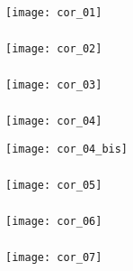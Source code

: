 \fi
\ifprof

\setcounter{exo}{0}

\subparagraph{}
\begin{center}
\texttt{[image: cor\_01]}
\end{center}

\subparagraph{}
\begin{center}
\texttt{[image: cor\_02]}
\end{center}

\subparagraph{}
\begin{center}
\texttt{[image: cor\_03]}
\end{center}

\subparagraph{}
\begin{center}
\texttt{[image: cor\_04]}

\texttt{[image: cor\_04\_bis]}
\end{center}

\subparagraph{}
\begin{center}
\texttt{[image: cor\_05]}
\end{center}

\subparagraph{}
\begin{center}
\texttt{[image: cor\_06]}
\end{center}

\subparagraph{}
\begin{center}
\texttt{[image: cor\_07]}
\end{center}
%
%
%
%

\else
\fi
